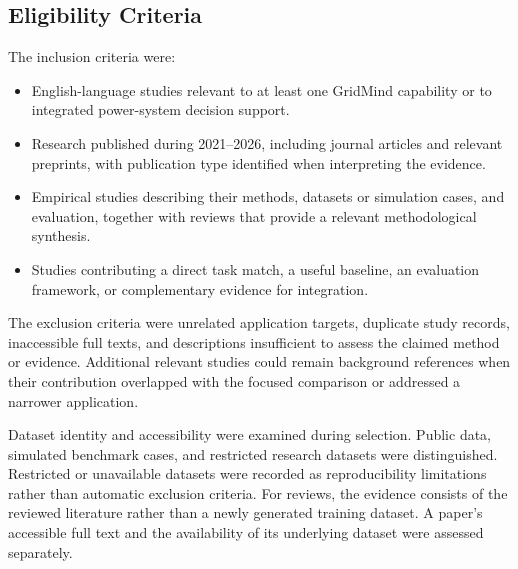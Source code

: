 \documentclass[journal,letterpaper]{IEEEtran}
\begin{document}
\subsection{Eligibility Criteria}
The inclusion criteria were:
\begin{itemize}
\item English-language studies relevant to at least one GridMind capability or to integrated power-system decision support.
\item Research published during 2021--2026, including journal articles and relevant preprints, with publication type identified when interpreting the evidence.
\item Empirical studies describing their methods, datasets or simulation cases, and evaluation, together with reviews that provide a relevant methodological synthesis.
\item Studies contributing a direct task match, a useful baseline, an evaluation framework, or complementary evidence for integration.
\end{itemize}
The exclusion criteria were unrelated application targets, duplicate study records, inaccessible full texts, and descriptions insufficient to assess the claimed method or evidence. Additional relevant studies could remain background references when their contribution overlapped with the focused comparison or addressed a narrower application.

Dataset identity and accessibility were examined during selection. Public data, simulated benchmark cases, and restricted research datasets were distinguished. Restricted or unavailable datasets were recorded as reproducibility limitations rather than automatic exclusion criteria. For reviews, the evidence consists of the reviewed literature rather than a newly generated training dataset. A paper's accessible full text and the availability of its underlying dataset were assessed separately.
\end{document}
